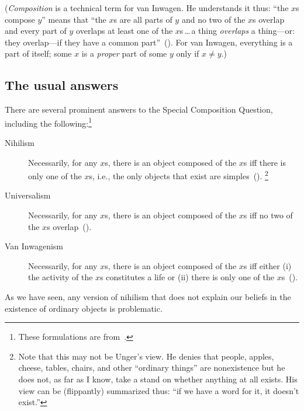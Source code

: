 \documentclass[11pt]{standalone}
\begin{document}
\begin{spacing}{1.5}
({\em Composition} is a technical term for van Inwagen.  He
understands it thus: ``the $x$s compose $y$'' means that ``the $x$s
are all parts of $y$ and no two of the $x$s overlap and every part of
$y$ overlaps at least one of the $x$s\,\ldots\,a thing {\em overlaps}
a thing---or: they overlap---if they have a common
part''~(\citeyear[29]{inwagen1995}).  For van Inwagen, everything is a
part of itself; some $x$ is a {\em proper} part of some $y$ only if $x
\neq y$.)

\subsection{The usual answers}
There are several prominent answers to the Special Composition
Question, including the following:\footnote{These formulations are
  from~\citet{markosian1998a}.}
\begin{description}
	\item[Nihilism] Necessarily, for any $x$s, there is an object
          composed of the $x$s iff there is only one of the $x$s,
          i.e., the only objects that exist are
          simples~(\citeyear[219]{markosian1998a}).
	\footnote{\label{flip} Note that this may not be Unger's view.
          He denies that people, apples, cheese, tables, chairs, and
          other ``ordinary things'' are nonexistence but he does not,
          as far as I know, take a stand on whether anything at all
          exists.  His view can be (flippantly) summarized thus: ``if
          we have a word for it, it doesn't exist.''}
	\item[Universalism] Necessarily, for any $x$s, there is an
          object composed of the $x$s iff no two of the $x$s
          overlap~(\citeyear[227]{markosian1998a}).
	\item[Van Inwagenism] Necessarily, for any $x$s, there is an
          object composed of the $x$s iff either (i) the activity of
          the $x$s constitutes a life or (ii) there is only one of the
          $x$s~(\citeyear[221]{markosian1998a}).
\end{description}

As we have seen, any version of nihilism that does not explain our
beliefs in the existence of ordinary objects is problematic.


\end{spacing}
\end{document}
